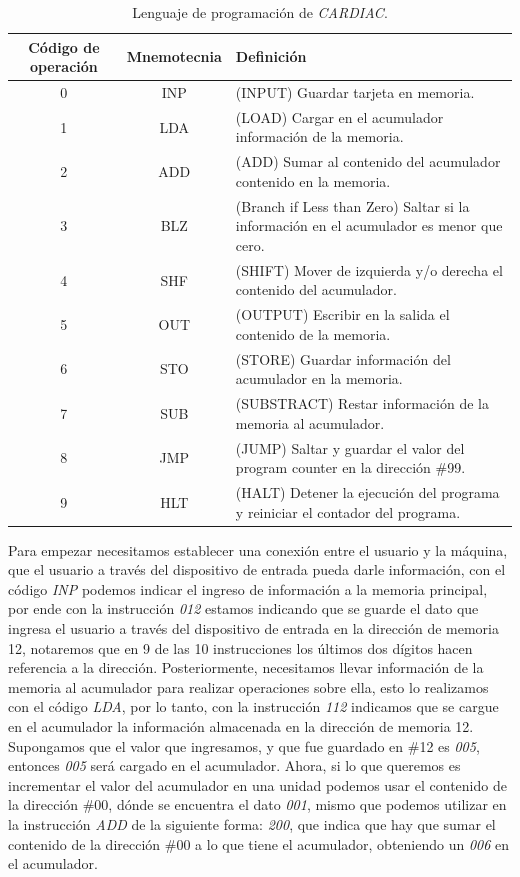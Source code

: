 \documentclass[letterpaper,12pt,oneside]{book}
\begin{document}
	
	\begin{table}[h]
	  \centering
	  \begin{tabular}{|c|c|p{8cm}|}
	    \hline
    	\textbf{Código de operación} & \textbf{Mnemotecnia} & \textbf{Definición} \\
	    \hline
	    0 & INP & (INPUT) Guardar tarjeta en memoria.\\
	    \hline
		1 & LDA & (LOAD)  Cargar en el acumulador información de la memoria.\\
		\hline
	    2 & ADD & (ADD)  Sumar al contenido del acumulador contenido en la memoria.\\
	    \hline
	    3 & BLZ & (Branch if Less than Zero) Saltar si la información en el acumulador es menor que cero.\\
	    \hline
	    4 & SHF & (SHIFT) Mover de izquierda y/o derecha el contenido del acumulador.\\
	    \hline
	    5 & OUT & (OUTPUT) Escribir en la salida el contenido de la memoria.\\
	    \hline
	    6 & STO & (STORE) Guardar información del acumulador en la memoria.\\
	    \hline
	    7 & SUB & (SUBSTRACT) Restar información de la memoria al acumulador.\\
	    \hline
	    8 & JMP & (JUMP) Saltar y guardar el valor del program counter en la dirección \#99. \\
	    \hline
	    9 & HLT & (HALT) Detener la ejecución del programa y reiniciar el contador del programa.\\
	    \hline
	  \end{tabular}
	  \caption{Lenguaje de programación de \textit{CARDIAC}.}
	  \label{tab:simple-table}
	\end{table}
	
	Para empezar necesitamos establecer una conexión entre el usuario y la máquina, que el usuario a través del dispositivo de entrada pueda
	darle información, con el código \textit{INP} podemos indicar el ingreso de información a la memoria principal, por ende con la instrucción  	
	\textit{012} estamos indicando que se guarde el dato que ingresa el usuario a través del dispositivo
	de entrada en la dirección de memoria 12, notaremos que en 9 de las 10 instrucciones los últimos dos dígitos hacen referencia a la dirección. 
	Posteriormente, necesitamos llevar información de la memoria al acumulador para realizar operaciones sobre ella, esto lo realizamos con el código 
	\textit{LDA}, por lo tanto, con la instrucción
	\textit{112} indicamos que se cargue en el acumulador la información almacenada en la dirección de memoria 12. Supongamos que el valor
	que ingresamos, y que fue guardado en 
	\#12 es \textit{005}, entonces \textit{005} será cargado en el acumulador. Ahora, si lo que queremos es incrementar el valor
	del acumulador en una unidad podemos usar el contenido de la dirección \#00, dónde se encuentra el dato \textit{001},
	mismo que podemos utilizar en la instrucción \textit{ADD} de la siguiente forma: \textit{200}, que indica que hay que sumar el contenido de la 
	dirección \#00 a lo que tiene
	el acumulador, obteniendo un \textit{006} en el acumulador.
	
\end{document}
